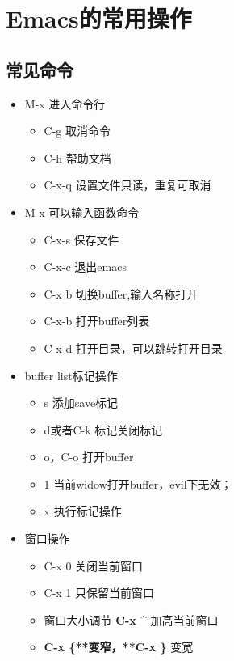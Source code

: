 \documentclass[11pt]{article}
\author{谢树强}
\date{\today}
\title{}
\begin{document}
\tableofcontents

\section{Emacs的常用操作}
\label{sec:org5078229}


\subsection{常见命令}
\label{sec:org3492d86}
\begin{itemize}
\item M-x 进入命令行
\begin{itemize}
\item C-g 取消命令
\item C-h 帮助文档
\item C-x-q 设置文件只读，重复可取消
\end{itemize}

\item M-x 可以输入函数命令
\begin{itemize}
\item C-x-s 保存文件
\item C-x-c 退出emacs
\item C-x b 切换buffer,输入名称打开
\item C-x-b 打开buffer列表
\item C-x d 打开目录，可以跳转打开目录
\end{itemize}
\end{itemize}


\begin{itemize}
\item buffer list标记操作
\begin{itemize}
\item s 添加save标记
\item d或者C-k 标记关闭标记
\item o，C-o 打开buffer
\item 1 当前widow打开buffer，evil下无效；
\item x 执行标记操作
\end{itemize}
\end{itemize}


\begin{itemize}
\item 窗口操作
\begin{itemize}
\item C-x 0 关闭当前窗口
\item C-x 1 只保留当前窗口
\item 窗口大小调节 \textbf{\textbf{C-x \^{}}} 加高当前窗口
\item \textbf{\textbf{C-x \{**变窄，**C-x \}}} 变宽
\end{itemize}
\end{itemize}
\end{document}

